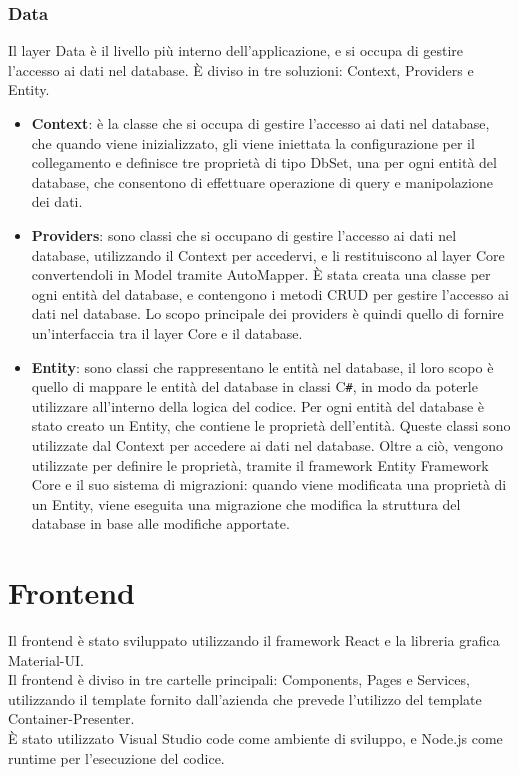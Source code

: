 \subsubsection{Data}
Il layer Data è il livello più interno dell'applicazione, e si occupa di gestire l'accesso ai dati nel database. È diviso in tre soluzioni: Context, Providers e Entity.\\
\begin{itemize}
\item \textbf{Context}: è la classe che si occupa di gestire l'accesso ai dati nel database, che quando viene inizializzato, gli viene iniettata la configurazione per il collegamento e definisce tre proprietà di tipo DbSet, una per ogni entità del database, che consentono di effettuare operazione di query e manipolazione dei dati.\\
\item \textbf{Providers}: sono classi che si occupano di gestire l'accesso ai dati nel database, utilizzando il Context per accedervi, e li restituiscono al layer Core convertendoli in Model tramite AutoMapper. È stata creata una classe per ogni entità del database, e contengono i metodi CRUD per gestire l'accesso ai dati nel database. Lo scopo principale dei providers è quindi quello di fornire un'interfaccia tra il layer Core e il database.\\
\item \textbf{Entity}: sono classi che rappresentano le entità nel database, il loro scopo è quello di mappare le entità del database in classi C\texttt{\#}, in modo da poterle utilizzare all'interno della logica del codice. Per ogni entità del database è stato creato un Entity, che contiene le proprietà dell'entità. Queste classi sono utilizzate dal Context per accedere ai dati nel database. Oltre a ciò, vengono utilizzate per definire le proprietà, tramite il framework Entity Framework Core e il suo sistema di migrazioni: quando viene modificata una proprietà di un Entity, viene eseguita una migrazione che modifica la struttura del database in base alle modifiche apportate.\\
\end{itemize}
\section{Frontend}
Il frontend è stato sviluppato utilizzando il framework React e la libreria grafica Material-UI.\\
Il frontend è diviso in tre cartelle principali: Components, Pages e Services, utilizzando il template fornito dall'azienda che prevede l'utilizzo del template Container-Presenter.\\
È stato utilizzato Visual Studio code come ambiente di sviluppo, e Node.js come runtime per l'esecuzione del codice.\\

